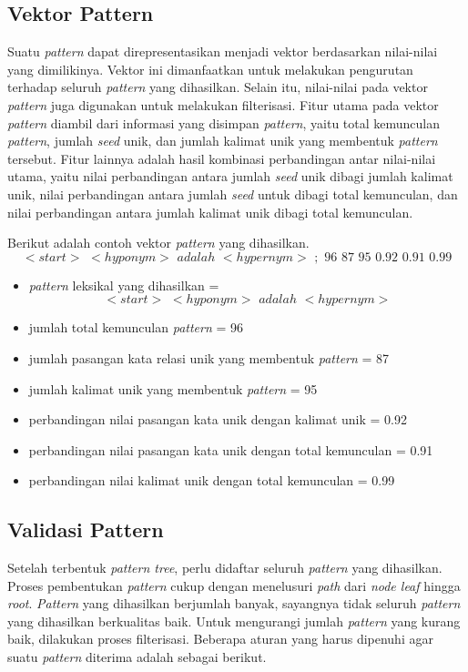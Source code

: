 \subsection{Vektor Pattern}
Suatu \textit{pattern} dapat direpresentasikan menjadi vektor berdasarkan nilai-nilai yang dimilikinya. Vektor ini dimanfaatkan untuk melakukan pengurutan terhadap seluruh \textit{pattern} yang dihasilkan. Selain itu, nilai-nilai pada vektor \textit{pattern} juga digunakan untuk melakukan filterisasi. Fitur utama pada vektor \textit{pattern} diambil dari informasi yang disimpan \textit{pattern}, yaitu total kemunculan \textit{pattern}, jumlah \textit{seed} unik, dan jumlah kalimat unik yang membentuk \textit{pattern} tersebut. Fitur lainnya adalah hasil kombinasi perbandingan antar nilai-nilai utama, yaitu nilai perbandingan antara jumlah \textit{seed} unik dibagi jumlah kalimat unik, nilai perbandingan antara jumlah \textit{seed} untuk dibagi total kemunculan, dan nilai perbandingan antara jumlah kalimat unik dibagi total kemunculan.

Berikut adalah contoh vektor \textit{pattern} yang dihasilkan.
\begin{equation}
<start>\,\,<hyponym>\,\,adalah\,\,<hypernym>\,\,;\,\,96\,\,87\,\,95\,\,0.92\,\,0.91\,\,0.99
\end{equation}
\begin{itemize}
  \item \textit{pattern} leksikal yang dihasilkan = \[<start>\,\,<hyponym>\,\,adalah\,\,<hypernym>\]
  \item jumlah total kemunculan \textit{pattern} = 96
  \item jumlah pasangan kata relasi unik yang membentuk \textit{pattern} = 87
  \item jumlah kalimat unik yang membentuk \textit{pattern} = 95
  \item perbandingan nilai pasangan kata unik dengan kalimat unik = 0.92
  \item perbandingan nilai pasangan kata unik dengan total kemunculan = 0.91
  \item perbandingan nilai kalimat unik dengan total kemunculan = 0.99
\end{itemize}

\subsection{Validasi Pattern}
Setelah terbentuk \textit{pattern tree}, perlu didaftar seluruh \textit{pattern} yang dihasilkan. Proses pembentukan \textit{pattern} cukup dengan menelusuri \textit{path} dari \textit{node leaf} hingga \textit{root}. \textit{Pattern} yang dihasilkan berjumlah banyak, sayangnya tidak seluruh \textit{pattern} yang dihasilkan berkualitas baik. Untuk mengurangi jumlah \textit{pattern} yang kurang baik, dilakukan proses filterisasi. Beberapa aturan yang harus dipenuhi agar suatu \textit{pattern} diterima adalah sebagai berikut.

